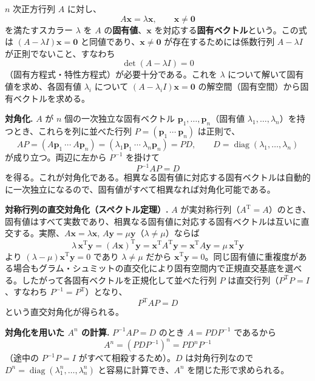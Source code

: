 \documentclass[a4paper,11pt]{article}
\begin{document}


\noindent
$n$ 次正方行列 $A$ に対し、
\[
A\bm{x} = \lambda \bm{x}, \qquad \bm{x} \neq \bm{0}
\]
を満たすスカラー $\lambda$ を $A$ の\textbf{固有値}、$\bm{x}$ を対応する\textbf{固有ベクトル}という。この式は $(A - \lambda I)\bm{x} = \bm{0}$ と同値であり、$\bm{x} \neq \bm{0}$ が存在するためには係数行列 $A - \lambda I$ が正則でないこと、すなわち
\[
\det(A - \lambda I) = 0
\]
（固有方程式・特性方程式）が必要十分である。これを $\lambda$ について解いて固有値を求め、各固有値 $\lambda_i$ について $(A - \lambda_i I)\bm{x} = \bm{0}$ の解空間（固有空間）から固有ベクトルを求める。

\medskip
\noindent
\textbf{対角化.} $A$ が $n$ 個の一次独立な固有ベクトル $\bm{p}_1, \dots, \bm{p}_n$（固有値 $\lambda_1, \dots, \lambda_n$）を持つとき、これらを列に並べた行列 $P = (\bm{p}_1 \ \cdots \ \bm{p}_n)$ は正則で、
\[
AP = (A\bm{p}_1 \ \cdots \ A\bm{p}_n) = (\lambda_1 \bm{p}_1 \ \cdots \ \lambda_n \bm{p}_n) = P D, \qquad D = \operatorname{diag}(\lambda_1, \dots, \lambda_n)
\]
が成り立つ。両辺に左から $P^{-1}$ を掛けて
\[
P^{-1} A P = D
\]
を得る。これが対角化である。相異なる固有値に対応する固有ベクトルは自動的に一次独立になるので、固有値がすべて相異なれば対角化可能である。

\medskip
\noindent
\textbf{対称行列の直交対角化（スペクトル定理）.} $A$ が実対称行列（$A^{\mathrm{T}} = A$）のとき、固有値はすべて実数であり、相異なる固有値に対応する固有ベクトルは互いに直交する。実際、$A\bm{x} = \lambda \bm{x}$, $A\bm{y} = \mu \bm{y}$（$\lambda \neq \mu$）ならば
\[
\lambda\, \bm{x}^{\mathrm{T}}\bm{y} = (A\bm{x})^{\mathrm{T}}\bm{y} = \bm{x}^{\mathrm{T}} A^{\mathrm{T}} \bm{y} = \bm{x}^{\mathrm{T}} A \bm{y} = \mu\, \bm{x}^{\mathrm{T}}\bm{y}
\]
より $(\lambda - \mu)\bm{x}^{\mathrm{T}}\bm{y} = 0$ であり $\lambda \neq \mu$ だから $\bm{x}^{\mathrm{T}}\bm{y} = 0$。同じ固有値に重複度がある場合もグラム・シュミットの直交化により固有空間内で正規直交基底を選べる。したがって各固有ベクトルを正規化して並べた行列 $P$ は直交行列（$P^{\mathrm{T}}P = I$、すなわち $P^{-1} = P^{\mathrm{T}}$）となり、
\[
P^{\mathrm{T}} A P = D
\]
という直交対角化が得られる。

\medskip
\noindent
\textbf{対角化を用いた $A^{n}$ の計算.} $P^{-1}AP = D$ のとき $A = PDP^{-1}$ であるから
\[
A^{n} = (PDP^{-1})^{n} = P D^{n} P^{-1}
\]
（途中の $P^{-1}P = I$ がすべて相殺するため）。$D$ は対角行列なので $D^{n} = \operatorname{diag}(\lambda_1^{n}, \dots, \lambda_n^{n})$ と容易に計算でき、$A^{n}$ を閉じた形で求められる。
\end{document}
